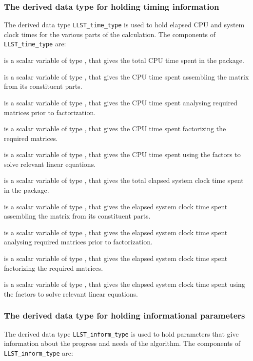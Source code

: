 \documentclass{galahad}
\newcommand{\packagename}{LLST}
\begin{document}
\subsubsection{The derived data type for holding timing
 information}\label{typetime}
The derived data type
{\tt \packagename\_time\_type}
is used to hold elapsed CPU and system clock times for the various parts of
the calculation. The components of
{\tt \packagename\_time\_type}
are:
\begin{description}
 is a scalar variable of type \realdp, that gives
 the total CPU time spent in the package.

 is a scalar variable of type \realdp, that gives
 the CPU time spent assembling the matrix  from its constituent parts.

 is a scalar variable of type \realdp, that gives
 the CPU time spent analysing required matrices prior to factorization.

 is a scalar variable of type \realdp, that gives
 the CPU time spent factorizing the required matrices.

 is a scalar variable of type \realdp, that gives
 the CPU time spent using the factors to solve relevant linear equations.

 is a scalar variable of type \realdp, that gives
 the total elapsed system clock time spent in the package.

 is a scalar variable of type \realdp, that gives
 the elapsed system clock time spent assembling the matrix  from
its constituent parts.

 is a scalar variable of type \realdp, that gives
 the elapsed system clock time spent analysing required matrices prior to
factorization.

 is a scalar variable of type \realdp, that gives
 the elapsed system clock time spent factorizing the required matrices.

 is a scalar variable of type \realdp, that gives
 the elapsed system clock time spent using the factors to solve relevant
linear equations.

\end{description}


\subsubsection{The derived data type for holding informational
 parameters}\label{typeinform}
The derived data type
{\tt \packagename\_inform\_type}
is used to hold parameters that give information about the progress and needs
of the algorithm. The components of
{\tt \packagename\_inform\_type}
are:
\end{document}

